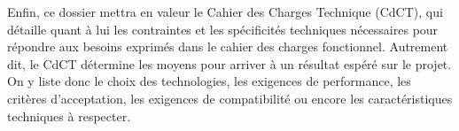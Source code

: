 Enfin, ce dossier mettra en valeur le Cahier des Charges Technique (CdCT), qui détaille quant à lui les contraintes et les spécificités techniques nécessaires pour répondre aux besoins exprimés dans le cahier des charges fonctionnel.
Autrement dit, le CdCT détermine les moyens pour arriver à un résultat espéré sur le projet.
On y liste donc le choix des technologies, les exigences de performance, les critères d'acceptation, les exigences de compatibilité ou encore les caractéristiques techniques à respecter.


